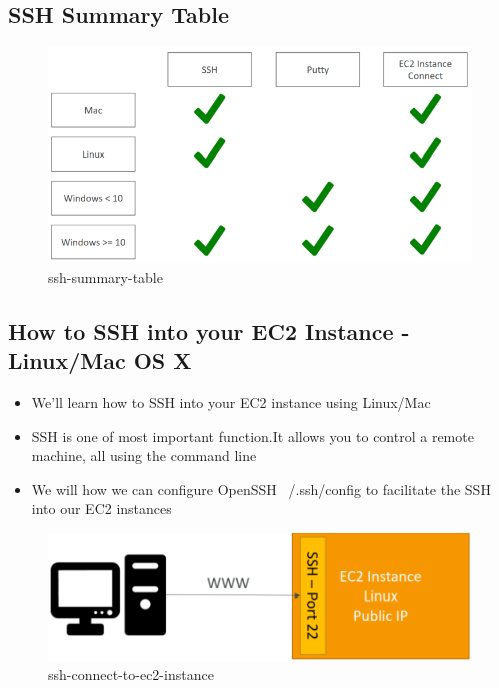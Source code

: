 \newpage

\subsection{SSH Summary Table}

\begin{figure}[h]
	\centering
	\includegraphics[width=1\linewidth]{images/ssh-summary-table.png}
	\caption{ssh-summary-table}
	\label{fig:ssh-summary-table}
\end{figure}



\subsection{How to SSH into your EC2 Instance -  Linux/Mac OS X}

\begin{itemize}
	\item We'll learn how to SSH into your EC2 instance using Linux/Mac 
	\item SSH is one of most important function.It allows you to control a remote machine, all using the command line
	\item We will how we can configure OpenSSH ~/.ssh/config to facilitate the SSH into our EC2 instances
\end{itemize}

\begin{figure}[htbp]
	\centering
	\includegraphics[width=1\linewidth]{images/ssh-connect-to-ec2-instance.png}
	\caption{ssh-connect-to-ec2-instance}
	\label{fig:ssh-connect-to-ec2-instance}
\end{figure}


